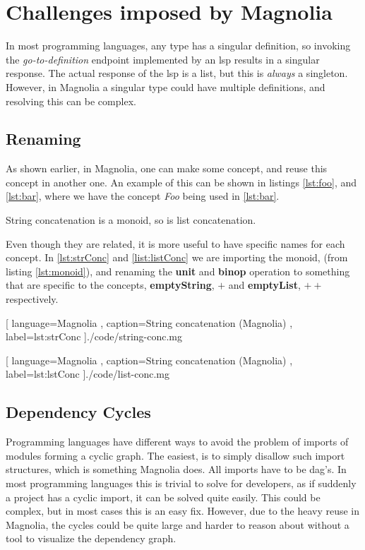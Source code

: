 \section{Challenges imposed by Magnolia}

In most programming languages, any type has a singular definition, so invoking
the \textit{go-to-definition} endpoint implemented by an \gls{lsp} results in a
singular response. The actual response of the \gls{lsp} is a list, but this is
\textit{always} a singleton. However, in Magnolia a singular type could have
multiple definitions, and resolving this can be complex.

\subsection{Renaming}

As shown earlier, in Magnolia, one can make some concept, and reuse this concept
in another one. An example of this can be shown in listings \ref{lst:foo}, and
\ref{lst:bar}, where we have the concept \textit{Foo} being used in \ref{lst:bar}.

String concatenation is a monoid, so is list concatenation.

Even though they are related, it is more useful to have specific names for each
concept. In \ref{lst:strConc} and \ref{list:listConc} we are importing the
monoid, (from listing \ref{lst:monoid}), and renaming the \textbf{unit} and
\textbf{binop} operation to something that are specific to the concepts,
\textbf{emptyString}, $+$ and \textbf{emptyList}, $++$ respectively.

\begin{center}
  
    [ language=Magnolia
    , caption={String concatenation (Magnolia)}
    , label=lst:strConc
    ]{./code/string-conc.mg}
\end{center}

\begin{center}
  
    [ language=Magnolia
    , caption={String concatenation (Magnolia)}
    , label=lst:lstConc
    ]{./code/list-conc.mg}
\end{center}

\subsection{Dependency Cycles}

Programming languages have different ways to avoid the problem of imports of
modules forming a cyclic graph. The easiest, is to simply disallow such import
structures, which is something Magnolia does. All imports have to be
\gls{dag}'s. In most programming languages this is trivial to solve for
developers, as if suddenly a project has a cyclic import, it can be solved quite
easily. This could be complex, but in most cases this is an easy fix. However,
due to the heavy reuse in Magnolia, the cycles could be quite large and harder
to reason about without a tool to visualize the dependency graph.


